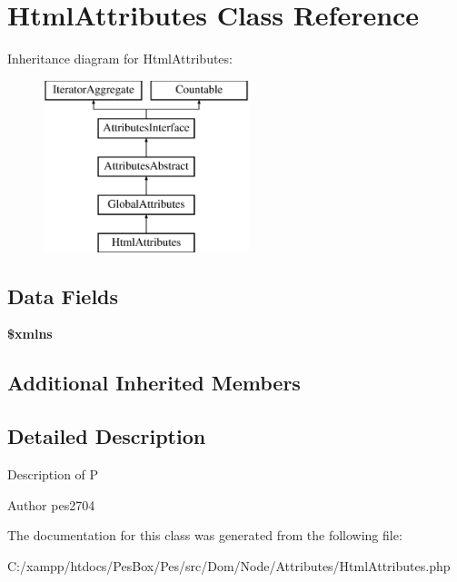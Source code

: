 \hypertarget{class_pes_1_1_dom_1_1_node_1_1_attributes_1_1_html_attributes}{}\section{Html\+Attributes Class Reference}
\label{class_pes_1_1_dom_1_1_node_1_1_attributes_1_1_html_attributes}
Inheritance diagram for Html\+Attributes\+:\begin{figure}[H]
\begin{center}
\leavevmode
\includegraphics[height=5.000000cm]{class_pes_1_1_dom_1_1_node_1_1_attributes_1_1_html_attributes}
\end{center}
\end{figure}
\subsection*{Data Fields}
\begin{DoxyCompactItemize}
\item 
\mbox{\label{class_pes_1_1_dom_1_1_node_1_1_attributes_1_1_html_attributes_aa2fd0b0f3d529a36290d421804cac854}} 
{\bfseries \$xmlns}
\end{DoxyCompactItemize}
\subsection*{Additional Inherited Members}


\subsection{Detailed Description}
Description of P

\begin{DoxyAuthor}{Author}
pes2704 
\end{DoxyAuthor}


The documentation for this class was generated from the following file\+:\begin{DoxyCompactItemize}
\item 
C\+:/xampp/htdocs/\+Pes\+Box/\+Pes/src/\+Dom/\+Node/\+Attributes/Html\+Attributes.\+php\end{DoxyCompactItemize}
